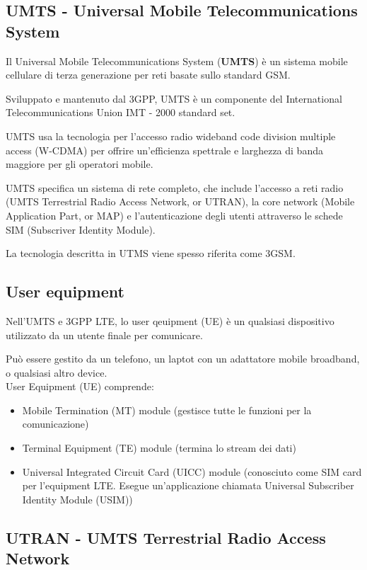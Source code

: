 \subsection{UMTS - Universal Mobile Telecommunications System}

Il Universal Mobile Telecommunications System (\textbf{UMTS}) è un sistema 
mobile cellulare di terza generazione per reti basate sullo standard GSM.

Sviluppato e mantenuto dal 3GPP, UMTS è un componente del International
Telecommunications Union IMT - 2000 standard set.

UMTS usa la tecnologia per l'accesso radio wideband code division multiple 
access (W-CDMA) per offrire un'efficienza spettrale e larghezza di banda maggiore
per gli operatori mobile.

UMTS specifica un sistema di rete completo, che include l'accesso a reti radio
(UMTS Terrestrial Radio Access Network, or UTRAN), la core network 
(Mobile Application Part, or MAP) e l'autenticazione degli utenti attraverso 
le schede SIM (Subscriver Identity Module).

La tecnologia descritta in UTMS viene spesso riferita come 3GSM.

\subsection{User equipment}

Nell'UMTS e 3GPP LTE, lo user qeuipment (UE) è un qualsiasi dispositivo utilizzato 
da un utente finale per comunicare.

Può essere gestito da un telefono, un laptot con un adattatore mobile broadband, 
o qualsiasi altro device. \\

User Equipment (UE) comprende:

\begin{itemize}
  \item Mobile Termination (MT) module (gestisce tutte le funzioni per la
  comunicazione)
  \item Terminal Equipment (TE) module (termina lo stream dei dati)
  \item Universal Integrated Circuit Card (UICC) module (conosciuto come SIM card
per l'equipment LTE. Esegue un'applicazione chiamata Universal Subscriber
Identity Module (USIM))
\end{itemize}

\subsection{UTRAN - UMTS Terrestrial Radio Access Network}

